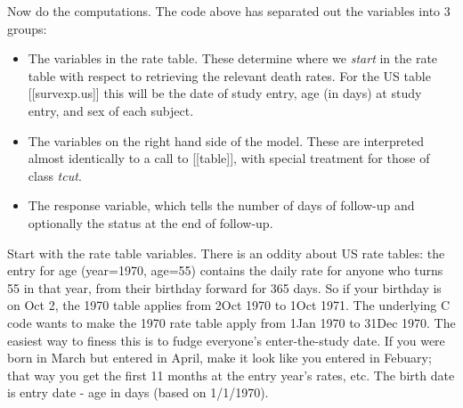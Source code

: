 \documentclass{article}
\begin{document}
Now do the computations.  
The code above has separated out the variables into 3 groups:
\begin{itemize}
  \item The variables in the rate table.  These determine where we 
    \emph{start} in the rate table with respect to retrieving the relevant
    death rates.  For the US table [[survexp.us]] this will be the date of
    study entry, age (in days) at study entry, and sex of each subject.
  \item The variables on the right hand side of the model.  These are 
    interpreted almost identically to a call to [[table]], with special
    treatment for those of class \emph{tcut}.
  \item The response variable, which tells the number of days of follow-up
    and optionally the status at the end of follow-up.
\end{itemize}

Start with the rate table variables. 
There is an oddity about US rate tables: the entry for age (year=1970,
age=55) contains the daily rate for anyone who turns 55 in that year,
from their birthday forward for 365 days.  So if your birthday is on
Oct 2, the 1970 table applies from 2Oct 1970 to 1Oct 1971.  The
underlying C code wants to make the 1970 rate table apply from 1Jan
1970 to 31Dec 1970.  The easiest way to finess this is to fudge
everyone's enter-the-study date.  If you were born in March but
entered in April, make it look like you entered in Febuary; that way
you get the first 11 months at the entry year's rates, etc.  The birth
date is entry date - age in days (based on 1/1/1970).
\end{document}
